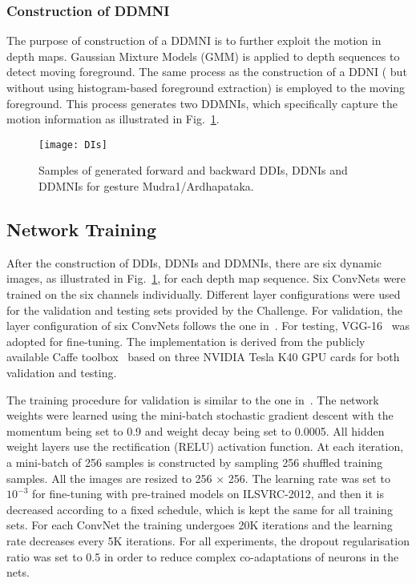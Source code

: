 \documentclass[10pt, a4paper, conference]{IEEEtran}
\begin{document}
\subsubsection{Construction of DDMNI}

The purpose of construction of a DDMNI is to further exploit the motion in depth maps. Gaussian Mixture Models (GMM) is applied to depth sequences to detect moving foreground. The same process as the construction of a DDNI ( but without using histogram-based foreground extraction) is employed to the moving foreground. This process generates two DDMNIs, which specifically capture the motion information as illustrated in Fig.~\ref{fig:DIs}.


\begin{figure}[t]
\begin{center}{\texttt{[image: DIs]}}
\end{center}
\caption{Samples of generated forward and backward DDIs, DDNIs and DDMNIs for gesture Mudra1/Ardhapataka.}
\label{fig:DIs}
\end{figure}


\subsection{Network Training}
After the construction of DDIs, DDNIs and DDMNIs, there are six dynamic images, as illustrated in Fig.~\ref{fig:DIs}, for each depth map sequence. Six ConvNets were trained on the six channels individually. Different layer configurations were used for the validation and testing sets provided by the Challenge. For validation, the layer configuration of six ConvNets follows the one in~\cite{krizhevsky2012imagenet}.  For testing, VGG-16~\cite{simonyan2014very} was adopted for fine-tuning. The implementation is derived from the publicly available Caffe toolbox~\cite{jia2014caffe} based on three {NVIDIA Tesla K40 GPU} cards for both validation and testing.

The training procedure for validation is similar to the one in~\cite{krizhevsky2012imagenet}. The network weights were learned using the mini-batch stochastic gradient descent with the momentum being set to 0.9 and weight decay being set to 0.0005. All hidden weight layers use the rectification (RELU) activation function. At each iteration, a mini-batch of 256 samples is constructed by sampling 256 shuffled training samples. All the images are resized to 256 $\times$ 256. The learning rate was set to $10^{-3}$ for fine-tuning with pre-trained models on ILSVRC-2012, and then it is decreased according to a fixed schedule, which is kept the same for all training sets. For each ConvNet the training undergoes 20K iterations and the learning rate decreases every 5K iterations. For all experiments, the dropout regularisation ratio was set to 0.5 in order to reduce complex co-adaptations of neurons in the nets.
\end{document}
